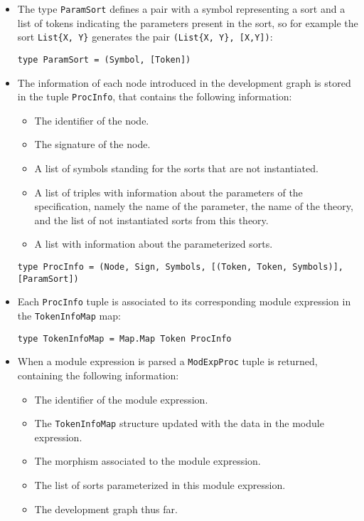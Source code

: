 \begin{itemize}

\item The type \verb"ParamSort" defines a pair with a symbol representing
a sort and a list of tokens indicating the parameters present in the sort,
so for example the sort \verb"List{X, Y}" generates the pair
\verb"(List{X, Y}, [X,Y])":

{\codesize
\begin{verbatim}
type ParamSort = (Symbol, [Token])
\end{verbatim}
}

\item The information of each node introduced
in the development graph is stored in the tuple \verb"ProcInfo", that
contains the following information:

\begin{itemize}
\item The identifier of the node.
\item The signature of the node.
\item A list of symbols standing for the sorts that are not instantiated.
\item A list of triples with information about the parameters of the
specification, namely the name of the parameter, the name of the theory,
and the list of not instantiated sorts from this theory.
\item A list with information about the parameterized sorts.
\end{itemize}

{\codesize
\begin{verbatim}
type ProcInfo = (Node, Sign, Symbols, [(Token, Token, Symbols)], [ParamSort])
\end{verbatim}
}

\item Each \verb"ProcInfo" tuple is associated to its corresponding module
expression in the \verb"TokenInfoMap" map:

{\codesize
\begin{verbatim}
type TokenInfoMap = Map.Map Token ProcInfo
\end{verbatim}
}

\item When a module expression is parsed a \verb"ModExpProc" tuple is
returned, containing the following information:

\begin{itemize}
\item The identifier of the module expression.
\item The \verb"TokenInfoMap" structure updated with the data
in the module expression.
\item The morphism associated to the module expression.
\item The list of sorts parameterized in this module expression.
\item The development graph thus far.
\end{itemize}


\end{itemize}
